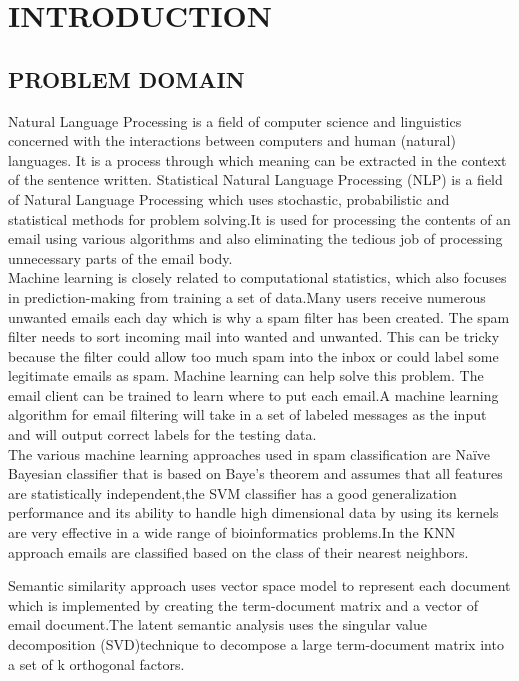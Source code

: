 
\chapter{INTRODUCTION} %
\section{PROBLEM DOMAIN}
\label{S:1}

Natural Language Processing is a field of computer science and linguistics concerned with the interactions between computers and human (natural) languages. It is a process through which meaning can be extracted in the context of the sentence written.  Statistical Natural Language Processing (NLP) is a field of Natural Language Processing which uses stochastic, probabilistic and statistical methods for problem solving.It is used for processing the contents of an email using various algorithms and also eliminating the tedious job of processing unnecessary parts of the email body.
\\
Machine learning is closely related to computational statistics, which also focuses in prediction-making from training a set of data.Many users receive numerous unwanted emails each day which is why a spam filter has been created. The spam filter needs to sort incoming mail into wanted and unwanted. This can be tricky because the filter could allow too much spam into the inbox or could label some legitimate emails as spam. Machine learning can help solve this problem. The email client can be trained to learn where to put each email.A machine learning algorithm for email filtering will take in a set of labeled messages as the input and will output correct labels for the testing data.
\\
The various machine learning approaches used in spam classification are Naïve Bayesian classifier that is based on Baye’s theorem and assumes that all features are statistically independent,the SVM classifier has a  good generalization performance and its ability to handle high dimensional data by using its kernels are very effective in a wide range of bioinformatics problems.In the KNN approach emails are classified based on the class of their nearest neighbors.

Semantic similarity approach uses vector space model to represent each document which is implemented by creating the term-document matrix and a vector of email document.The latent semantic analysis uses the singular value decomposition (SVD)technique to decompose a large term-document matrix into a set of k orthogonal factors.

